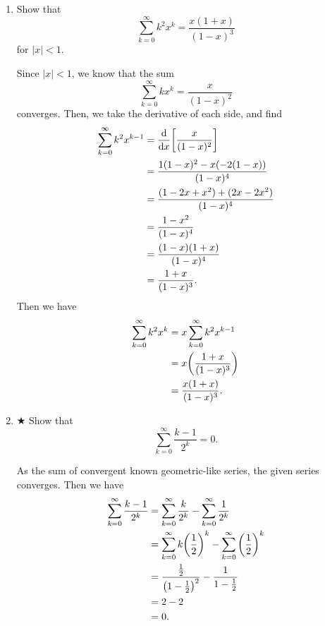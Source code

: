 \documentclass[AppendixA]{subfiles}
\begin{document}
\begin{enumerate}[leftmargin=\labelsep]
		\item Show that
		\[
			\sum_{k = 0}^\infty k^2 x^k = \frac{x(1 + x)}{(1 - x)^3}
		\]
		for $|x| < 1$.
		\begin{answer}
			Since $|x| < 1$, we know that the sum
			\[
				\sum_{k = 0}^\infty kx^k = \frac{x}{(1-x)^2}
			\]
			converges. Then, we take the derivative of each side, and find
			\begin{align*}
				\sum_{k = 0}^\infty k^2x^{k - 1} &= \dv{}{x} \qty[\frac{x}{(1-x)^2}]\\
					&= \frac{1(1-x)^2 - x(-2(1 - x))}{(1-x)^4}\\
					&= \frac{(1 - 2x + x^2 )+ (2x - 2x^2)}{(1-x)^4}\\
					&= \frac{1 - x^2}{(1-x)^4}\\
					&= \frac{(1 - x)(1 + x)}{(1-x)^4}\\
					&= \frac{1 + x}{(1-x)^3}.
			\end{align*}
			Then we have
			\begin{align*}
				\sum_{k = 0}^\infty k^2 x^k &= x \sum_{k = 0}^\infty k^2x^{k - 1}\\
					&= x \qty(\frac{1 + x}{(1-x)^3})\\
					&= \frac{x(1 + x)}{(1-x)^3}.
			\end{align*}
		\end{answer}
		
		\item $\bigstar$ Show that
		\[
			\sum_{k = 0}^\infty \frac{k - 1}{2^k} = 0.
		\]
		\begin{answer}
			As the sum of convergent known geometric-like series, the given series converges. Then we have
			\begin{align*}
				\sum_{k = 0}^\infty \frac{k - 1}{2^k} &= \sum_{k = 0}^\infty \frac{k}{2^k} - \sum_{k = 0}^\infty \frac{1}{2^k}\\
					&= \sum_{k = 0}^\infty k\qty(\frac{1}{2})^k - \sum_{k = 0}^\infty \qty(\frac{1}{2})^k\\
					&= \frac{\frac{1}{2}}{\qty(1 - \frac{1}{2})^2} - \frac{1}{1 - \frac{1}{2}}\\
					&= 2 - 2\\
					&= 0.
			\end{align*}
		\end{answer}
		

\end{enumerate}
\end{document}
